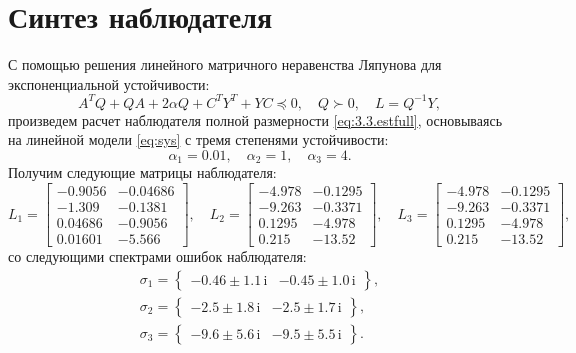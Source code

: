 \section{Синтез наблюдателя}

С помощью решения линейного матричного неравенства Ляпунова для 
экспоненциальной устойчивости:
\begin{equation*}
    A^TQ+QA+2\alpha Q+C^TY^T+YC\preccurlyeq0,\quad Q\succ0,\quad
    L=Q^{-1}Y,
\end{equation*}
произведем расчет наблюдателя полной размерности \eqref{eq:3.3.estfull}, 
основываясь на линейной модели \eqref{eq:sys} с тремя степенями устойчивости:
\begin{equation*}
    \alpha_1=0.01,\quad \alpha_2=1,\quad \alpha_3=4.
\end{equation*}
Получим следующие матрицы наблюдателя:
\begin{equation*}
    L_1=\begin{bmatrix}
-0.9056 & -0.04686\\
-1.309 & -0.1381\\
0.04686 & -0.9056\\
0.01601 & -5.566
    \end{bmatrix},\quad
    L_2=\begin{bmatrix}
-4.978 & -0.1295\\
-9.263 & -0.3371\\
0.1295 & -4.978\\
0.215 & -13.52
    \end{bmatrix},\quad
    L_3=\begin{bmatrix}
-4.978 & -0.1295\\
-9.263 & -0.3371\\
0.1295 & -4.978\\
0.215 & -13.52
    \end{bmatrix},
\end{equation*}
со следующими спектрами ошибок наблюдателя:
\begin{gather*}
    \sigma_1=\left\{ \begin{array}{cc}
-0.46\pm1.1\,\mathrm{i}&
-0.45\pm1.0\,\mathrm{i}
    \end{array} \right\},\\
    \sigma_2=\left\{ \begin{array}{cc}
-2.5\pm1.8\,\mathrm{i}&
-2.5\pm1.7\,\mathrm{i}
    \end{array} \right\},\\
    \sigma_3=\left\{ \begin{array}{cc}
-9.6\pm5.6\,\mathrm{i}&
-9.5\pm5.5\,\mathrm{i}
    \end{array} \right\}.
\end{gather*}
